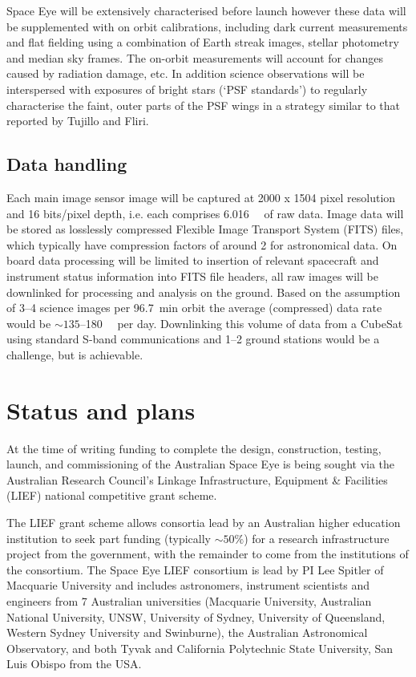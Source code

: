 \documentclass[]{iac}
\begin{document}
Space Eye will be extensively characterised before launch however these data will be supplemented with on orbit
calibrations, including dark current measurements and flat fielding using a combination of Earth streak images, stellar
photometry and median sky frames. The on-orbit measurements will account for changes caused by radiation damage, etc.
In addition science observations will be interspersed with exposures of bright stars (`PSF standards') to regularly
characterise the faint, outer parts of the PSF wings in a strategy similar to that reported by Tujillo and
Fliri\cite{Trujillo2015}.

\subsection{Data handling}

Each main image sensor image will be captured at 2000 x 1504 pixel resolution and 16 bits/pixel depth, i.e. each
comprises \SI{6.016}{\mega\byte} of raw data. Image data will be stored as losslessly compressed Flexible Image
Transport System (FITS) files, which typically have compression factors of around 2 for astronomical data. On board data
processing will be limited to insertion of relevant spacecraft and instrument status information into FITS file headers,
all raw images will be downlinked for processing and analysis on the ground. Based on the assumption of 3--4 science
images per \SI{96.7}{\minute} orbit the average (compressed) data rate would be $\sim135$--\SI{180}{\mega\byte} per day.
Downlinking this volume of data from a CubeSat using standard S-band communications and 1--2 ground stations would be a
challenge, but is achievable\cite{Reisenfeld2015}.

\section{Status and plans}

At the time of writing funding to complete the design, construction, testing, launch, and commissioning of the
Australian Space Eye is being sought via the Australian Research Council's Linkage Infrastructure, Equipment \&
Facilities (LIEF) national competitive grant scheme.

The LIEF grant scheme allows consortia lead by an Australian higher education institution to seek part funding
(typically $\sim50\%$) for a research infrastructure project from the government, with the remainder to come from the
institutions of the consortium. The Space Eye LIEF consortium is lead by PI Lee Spitler of Macquarie University and
includes astronomers, instrument scientists and engineers from 7 Australian universities (Macquarie University,
Australian National University, UNSW, University of Sydney, University of Queensland, Western Sydney University and
Swinburne), the Australian Astronomical Observatory, and both Tyvak and California Polytechnic State University, San
Luis Obispo from the USA.
\end{document}
